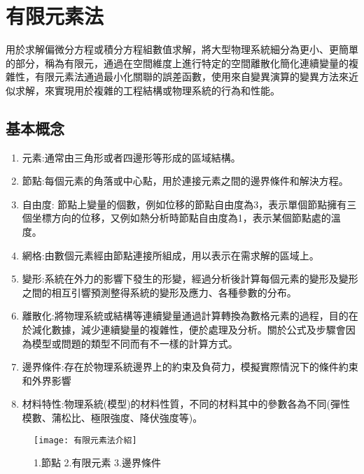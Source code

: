 \chapter{有限元素法}
用於求解偏微分方程或積分方程組數值求解，將大型物理系統細分為更小、更簡單的部分，稱為有限元，通過在空間維度上進行特定的空間離散化簡化連續變量的複雜性，有限元素法通過最小化關聯的誤差函數，使用來自變異演算的變異方法來近似求解，來實現用於複雜的工程結構或物理系統的行為和性能。\\

\section{基本概念}
\begin{enumerate}
\item 元素:通常由三角形或者四邊形等形成的區域結構。
\item 節點:每個元素的角落或中心點，用於連接元素之間的邊界條件和解決方程。
\item 自由度: 節點上變量的個數，例如位移的節點自由度為3，表示單個節點擁有三個坐標方向的位移，又例如熱分析時節點自由度為1，表示某個節點處的溫度。
\item 網格:由數個元素經由節點連接所組成，用以表示在需求解的區域上。
\item 變形:系統在外力的影響下發生的形變，經過分析後計算每個元素的變形及變形之間的相互引響預測整得系統的變形及應力、各種參數的分布。
\item 離散化:將物理系統或結構等連續變量通過計算轉換為數格元素的過程，目的在於減化數據，減少連續變量的複雜性，便於處理及分析。關於公式及步驟會因為模型或問題的類型不同而有不一樣的計算方式。
\item 邊界條件:存在於物理系統邊界上的約束及負荷力，模擬實際情況下的條件約束和外界影響
\item 材料特性:物理系統(模型)的材料性質，不同的材料其中的參數各為不同(彈性模數、蒲松比、極限強度、降伏強度等)。
\end{enumerate}

\begin{figure}[hbt!]
\begin{center}
\texttt{[image: 有限元素法介紹]}
\caption{\Large 1.節點 2.有限元素 3.邊界條件}\label{有限元素法介紹}
\end{center}
\end{figure}
\newpage


